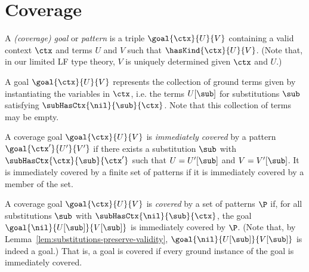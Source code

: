 \clearpage

\section*{Coverage}

\begin{definition}
\label{def:coverage-goal}
A \emph{(coverage) goal} or \emph{pattern} is a triple $\goal{\ctx}{U}{V}$ containing a valid context $\ctx$ and terms $U$ and $V$ such that $\hasKind{\ctx}{U}{V}$.
(Note that, in our limited LF type theory, $V$ is uniquely determined given $\ctx$ and $U$.)
\end{definition}

A goal $\goal{\ctx}{U}{V}$ represents the collection of ground terms given by instantiating the variables in $\ctx$, i.e. the terms $U[\sub]$ for substitutions $\sub$ satisfying $\subHasCtx{\nil}{\sub}{\ctx}$.
Note that this collection of terms may be empty.

\begin{definition}
\label{def:immediate-coverage}
A coverage goal $\goal{\ctx}{U}{V}$ is \emph{immediately covered} by a pattern $\goal{\ctx'}{U'}{V'}$ if there exists a substitution $\sub$ with $\subHasCtx{\ctx}{\sub}{\ctx'}$ such that $U = U'[\sub]$ and $V = V'[\sub]$.
It is immediately covered by a finite set of patterns if it is immediately covered by a member of the set.
\end{definition}

\begin{definition}[Coverage]
\label{def:coverage}
A coverage goal $\goal{\ctx}{U}{V}$ is \emph{covered} by a set of patterns $\P$ if, for all substitutions $\sub$ with $\subHasCtx{\nil}{\sub}{\ctx}$, the goal $\goal{\nil}{U[\sub]}{V[\sub]}$ is immediately covered by $\P$.
(Note that, by Lemma~\ref{lem:substitutions-preserve-validity}, $\goal{\nil}{U[\sub]}{V[\sub]}$ is indeed a goal.)
That is, a goal is covered if every ground instance of the goal is immediately covered.
\end{definition}

